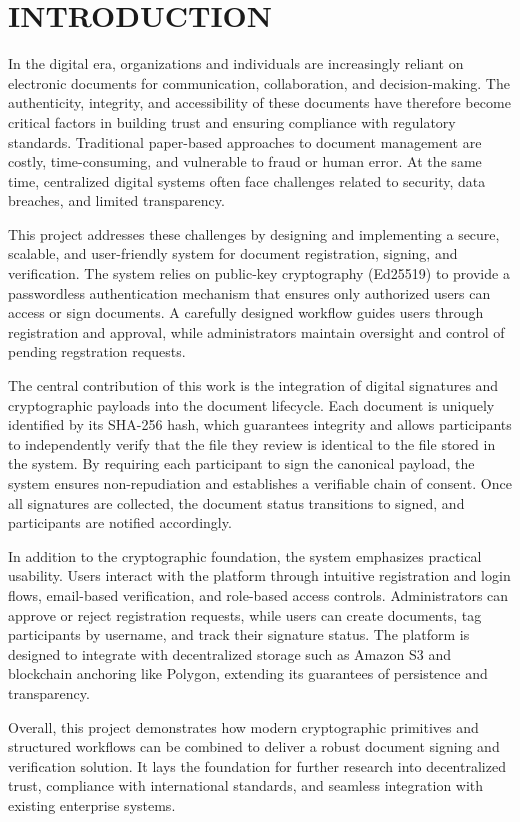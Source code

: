 \chapter*{INTRODUCTION}

In the digital era, organizations and individuals are increasingly reliant on electronic documents for communication, collaboration, and decision-making. The authenticity, integrity, and accessibility of these documents have therefore become critical factors in building trust and ensuring compliance with regulatory standards. Traditional paper-based approaches to document management are costly, time-consuming, and vulnerable to fraud or human error. At the same time, centralized digital systems often face challenges related to security, data breaches, and limited transparency.

This project addresses these challenges by designing and implementing a secure, scalable, and user-friendly system for document registration, signing, and verification. The system relies on public-key cryptography (Ed25519) to provide a passwordless authentication mechanism that ensures only authorized users can access or sign documents. A carefully designed workflow guides users through registration and approval, while administrators maintain oversight and control of pending regstration requests.

The central contribution of this work is the integration of digital signatures and cryptographic payloads into the document lifecycle. Each document is uniquely identified by its SHA-256 hash, which guarantees integrity and allows participants to independently verify that the file they review is identical to the file stored in the system. By requiring each participant to sign the canonical payload, the system ensures non-repudiation and establishes a verifiable chain of consent. Once all signatures are collected, the document status transitions to signed, and participants are notified accordingly.

In addition to the cryptographic foundation, the system emphasizes practical usability. Users interact with the platform through intuitive registration and login flows, email-based verification, and role-based access controls. Administrators can approve or reject registration requests, while users can create documents, tag participants by username, and track their signature status. The platform is designed to integrate with decentralized storage such as Amazon S3 and blockchain anchoring like Polygon, extending its guarantees of persistence and transparency.

Overall, this project demonstrates how modern cryptographic primitives and structured workflows can be combined to deliver a robust document signing and verification solution. It lays the foundation for further research into decentralized trust, compliance with international standards, and seamless integration with existing enterprise systems.
